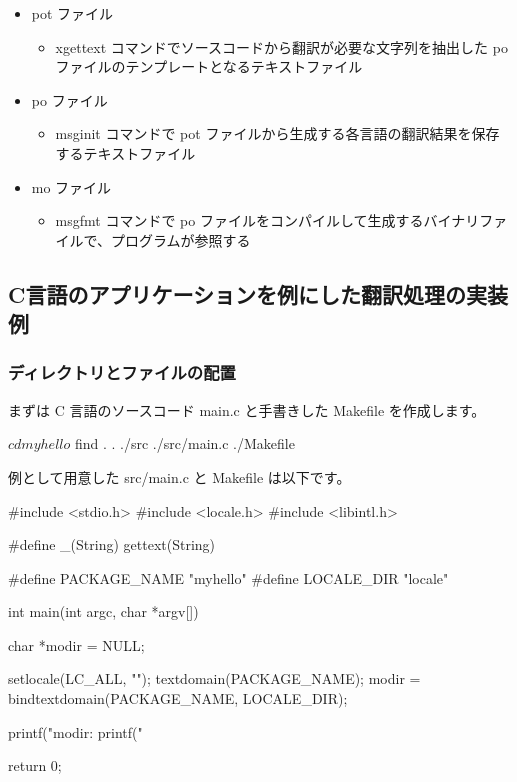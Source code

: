 \documentclass[mingoth,a4paper]{jsarticle}
\begin{document}
\begin{itemize}
\item pot ファイル
  \begin{itemize}
  \item xgettext コマンドでソースコードから翻訳が必要な文字列を抽出した po ファイルのテンプレートとなるテキストファイル
  \end{itemize}
\item po ファイル
  \begin{itemize}
  \item msginit コマンドで pot ファイルから生成する各言語の翻訳結果を保存するテキストファイル
  \end{itemize}
\item mo ファイル
  \begin{itemize}
  \item msgfmt コマンドで po ファイルをコンパイルして生成するバイナリファイルで、プログラムが参照する
  \end{itemize}
\end{itemize}


\subsection{C言語のアプリケーションを例にした翻訳処理の実装例}

\subsubsection{ディレクトリとファイルの配置}

まずは C 言語のソースコード main.c と手書きした Makefile を作成します。

\begin{commandline}
$ cd myhello
$ find .
.
./src
./src/main.c
./Makefile
\end{commandline}

例として用意した src/main.c と Makefile は以下です。

\begin{commandline}
#include <stdio.h>
#include <locale.h>
#include <libintl.h>

#define _(String) gettext(String)

#define PACKAGE_NAME "myhello"
#define LOCALE_DIR   "locale"

int main(int argc, char *argv[])
{
    char *modir = NULL;

    setlocale(LC_ALL, "");
    textdomain(PACKAGE_NAME);
    modir = bindtextdomain(PACKAGE_NAME, LOCALE_DIR);

    printf("modir: %
    printf("%

    return 0;
}
\end{commandline}
\end{document}
